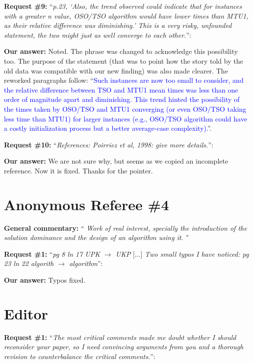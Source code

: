 \documentclass{elsarticle}
\begin{document}
\textbf{Request \#9:} ``\textit{p.23, `Also, the trend observed could indicate that for instances with a greater n value, OSO/TSO algorithm would have lower times than MTU1, as their relative difference was diminishing.' This is a very risky, unfounded statement, the two might just as well converge to each other.}'':

\textbf{Our answer:} Noted. The phrase was changed to acknowledge this possibility too. The purpose of the statement (that was to point how the story told by the old data was compatible with our new finding) was also made clearer. The reworked paragraphs follow: ``\textcolor{blue}{Such instances are now too small to consider, and the relative difference between TSO and MTU1 mean times was less than one order of magnitude apart and diminishing. This trend hinted the possibility of the times taken by OSO/TSO and MTU1 converging (or even OSO/TSO taking less time than MTU1) for larger instances (e.g., OSO/TSO algorithm could have a costly initialization process but a better average-case complexity).}''.
\medskip

\textbf{Request \#10:} ``\textit{References: Poirriez et al, 1998: give more details.}'':

\textbf{Our answer:} We are not sure why, but seems as we copied an incomplete reference. Now it is fixed. Thanks for the pointer.

\section{Anonymous Referee \#4}

\textbf{General commentary:} ``\textit{
Work of real interest, specially the introduction of the solution dominance and the design of an algorithm using it.
}''

\textbf{Request \#1:} ``\textit{pg 8 ln 17 UPK \(\rightarrow\) UKP} [...] \textit{Two small typos I have noticed: pg 23 ln 22 algorith \(\rightarrow\) algorithm}'':

\textbf{Our answer:} Typos fixed.

\section{Editor}

\textbf{Request \#1:} ``\textit{The most critical comments made me doubt whether I should reconsider your paper, so I need convincing arguments from you and a thorough revision to counterbalance the critical comments.}'':
\end{document}
